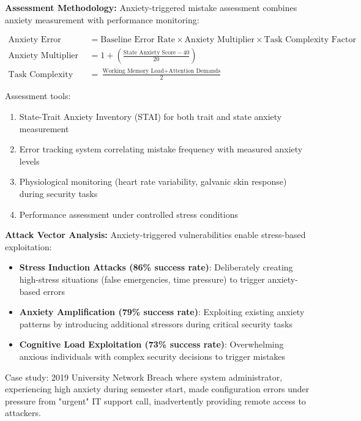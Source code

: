 \documentclass[11pt,a4paper]{article}
\begin{document}
\textbf{Assessment Methodology:}
Anxiety-triggered mistake assessment combines anxiety measurement with performance monitoring:

\begin{align}
\text{Anxiety Error Index} &= \text{Baseline Error Rate} \times \text{Anxiety Multiplier} \times \text{Task Complexity Factor} \\
\text{Anxiety Multiplier} &= 1 + \left(\frac{\text{State Anxiety Score} - 40}{20}\right) \\
\text{Task Complexity Factor} &= \frac{\text{Working Memory Load} + \text{Attention Demands}}{2}
\end{align}

Assessment tools:
\begin{enumerate}
\item State-Trait Anxiety Inventory (STAI) for both trait and state anxiety measurement
\item Error tracking system correlating mistake frequency with measured anxiety levels
\item Physiological monitoring (heart rate variability, galvanic skin response) during security tasks
\item Performance assessment under controlled stress conditions
\end{enumerate}

\textbf{Attack Vector Analysis:}
Anxiety-triggered vulnerabilities enable stress-based exploitation:
\begin{itemize}
\item \textbf{Stress Induction Attacks (86\% success rate)}: Deliberately creating high-stress situations (false emergencies, time pressure) to trigger anxiety-based errors
\item \textbf{Anxiety Amplification (79\% success rate)}: Exploiting existing anxiety patterns by introducing additional stressors during critical security tasks
\item \textbf{Cognitive Load Exploitation (73\% success rate)}: Overwhelming anxious individuals with complex security decisions to trigger mistakes
\end{itemize}

Case study: 2019 University Network Breach where system administrator, experiencing high anxiety during semester start, made configuration errors under pressure from "urgent" IT support call, inadvertently providing remote access to attackers.
\end{document}
